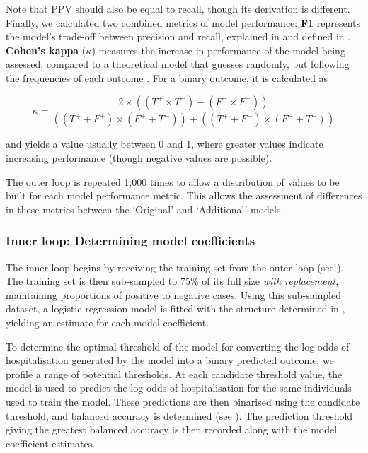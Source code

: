 Note that PPV should also be equal to recall, though its derivation is different. Finally, we calculated two combined metrics of model performance:
\textbf{F1} represents the model's trade-off between precision and recall, explained in  and defined in . \textbf{Cohen's kappa} ($\kappa$) measures the increase in performance of the model being assessed, compared to a theoretical model that guesses randomly, but following the frequencies of each outcome \cite{Landis1977}. For a binary outcome, it is calculated as

\begin{equation}
\kappa = \frac{2 \times ((T^+ \times T^-) - (F^- \times F^+))}
{((T^+ + F^+) \times (F^+ +  T^-)) + ((T^+ + F^-) \times (F^- +  T^-))}
\end{equation}

and yields a value usually between 0 and 1, where greater values indicate increasing performance (though negative values are possible).

The outer loop is repeated 1,000 times to allow a distribution of values to be built for each model performance metric. This allows the assessment of differences in these metrics between the `Original' and `Additional' models.

 	
\subsubsection{Inner loop: Determining model coefficients}
\label{sec:additional-inner-loop}

The inner loop begins by receiving the training set from the outer loop (see ). The training set is then sub-sampled to 75\% of its full size \textit{with replacement}, maintaining proportions of positive to negative cases. Using this sub-sampled dataset, a logistic regression model is fitted with the structure determined in , yielding an estimate for each model coefficient.

To determine the optimal threshold of the model for converting the log-odds of hospitalisation generated by the model into a binary predicted outcome, we profile a range of potential thresholds. At each candidate threshold value, the model is used to predict the log-odds of hospitalisation for the same individuals used to train the model. These predictions are then binarised using the candidate threshold, and balanced accuracy is determined (see ). The prediction threshold giving the greatest balanced accuracy is then recorded along with the model coefficient estimates.

